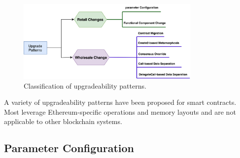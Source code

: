 \begin{figure}[t]
  \centering
      \includegraphics[width=0.8\textwidth]{figures/New_Classification.png}
  \caption{Classification of upgradeability patterns.\label{fig:class}}
 \end{figure}
 
A variety of upgradeability patterns have been proposed for smart contracts. Most leverage Ethereum-specific operations and memory layouts and are not applicable to other blockchain systems.





\subsection{Parameter Configuration}
\label{sec:parameter}

